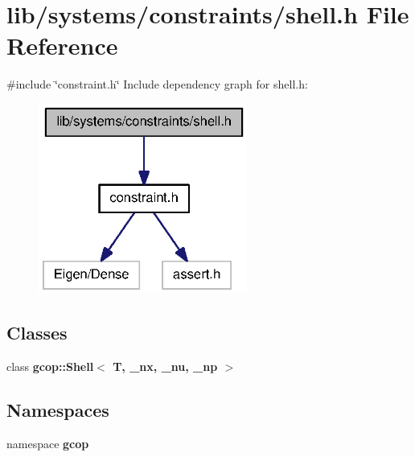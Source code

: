 \section{lib/systems/constraints/shell.h \-File \-Reference}
\label{shell_8h}
{\ttfamily \#include \char`\"{}constraint.\-h\char`\"{}}\*
\-Include dependency graph for shell.\-h\-:\nopagebreak
\begin{figure}[H]
\begin{center}
\leavevmode
\includegraphics[width=194pt]{shell_8h__incl}
\end{center}
\end{figure}
\subsection*{\-Classes}
\begin{DoxyCompactItemize}
\item 
class {\bf gcop\-::\-Shell$<$ T, \-\_\-nx, \-\_\-nu, \-\_\-np $>$}
\end{DoxyCompactItemize}
\subsection*{\-Namespaces}
\begin{DoxyCompactItemize}
\item 
namespace {\bf gcop}
\end{DoxyCompactItemize}
